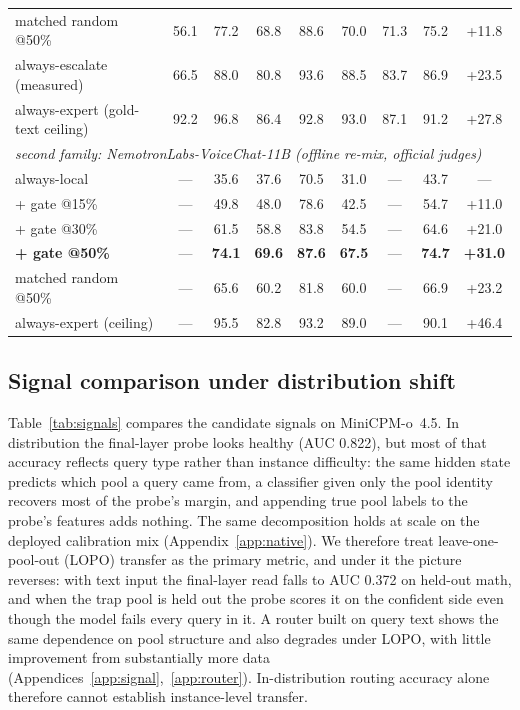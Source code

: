 \begin{table}[t]
\begin{tabular}{lcccccccc}
\;matched random @50\% & 56.1 & 77.2 & 68.8 & 88.6 & 70.0 & 71.3 & 75.2 & +11.8 \\
always-escalate (measured) & 66.5 & 88.0 & 80.8 & 93.6 & 88.5 & 83.7 & 86.9 & +23.5 \\
always-expert (gold-text ceiling) & 92.2 & 96.8 & 86.4 & 92.8 & 93.0 & 87.1 & 91.2 & +27.8 \\
\midrule
\multicolumn{9}{l}{\emph{second family: NemotronLabs-VoiceChat-11B (offline re-mix, official judges)}} \\
always-local          & --- & 35.6 & 37.6 & 70.5 & 31.0 & --- & 43.7 & --- \\
\;+ gate @15\%        & --- & 49.8 & 48.0 & 78.6 & 42.5 & --- & 54.7 & +11.0 \\
\;+ gate @30\%        & --- & 61.5 & 58.8 & 83.8 & 54.5 & --- & 64.6 & +21.0 \\
\;\textbf{+ gate @50\%} & --- & \textbf{74.1} & \textbf{69.6} & \textbf{87.6} & \textbf{67.5} & --- & \textbf{74.7} & \textbf{+31.0} \\
\;matched random @50\% & --- & 65.6 & 60.2 & 81.8 & 60.0 & --- & 66.9 & +23.2 \\
always-expert (ceiling) & --- & 95.5 & 82.8 & 93.2 & 89.0 & --- & 90.1 & +46.4 \\
\bottomrule
\end{tabular}
\end{table}

\subsection{Signal comparison under distribution shift}
\label{sec:audit}

Table~\ref{tab:signals} compares the candidate signals on
MiniCPM-o~4.5. In distribution the final-layer probe looks healthy
(AUC 0.822), but most of that accuracy reflects query type rather
than instance difficulty: the same hidden state predicts which pool a
query came from, a classifier given only the pool identity recovers
most of the probe's margin, and appending true pool labels to the
probe's features adds nothing. The same decomposition holds at scale
on the deployed calibration mix (Appendix~\ref{app:native}). We
therefore treat leave-one-pool-out (LOPO) transfer as the primary
metric, and under it the picture reverses: with text input the
final-layer read falls to AUC 0.372 on held-out math, and when the
trap pool is held out the probe scores it on the confident side even
though the model fails every query in it. A router built on query
text shows the same dependence on pool structure and also degrades
under LOPO, with little improvement from substantially more data
(Appendices~\ref{app:signal},~\ref{app:router}). In-distribution
routing accuracy alone therefore cannot establish instance-level
transfer.

